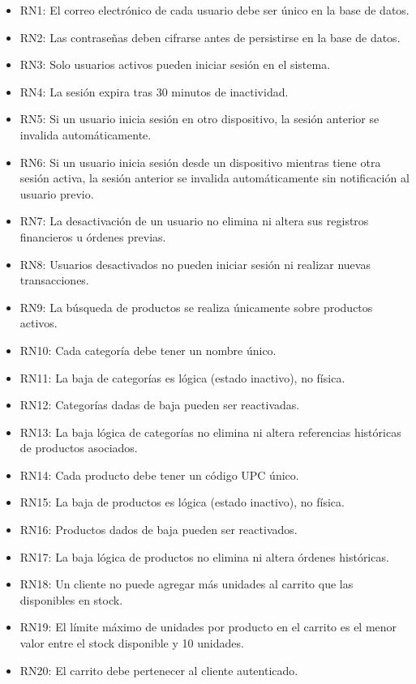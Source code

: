 \documentclass[12pt,a4paper]{article}
\begin{document}
\begin{itemize}[label=--]
    \item RN1: El correo electrónico de cada usuario debe ser único en la base de datos.
    \item RN2: Las contraseñas deben cifrarse antes de persistirse en la base de datos.
    \item RN3: Solo usuarios activos pueden iniciar sesión en el sistema.
    \item RN4: La sesión expira tras 30 minutos de inactividad.
    \item RN5: Si un usuario inicia sesión en otro dispositivo, la sesión anterior se invalida automáticamente.
    \item RN6: Si un usuario inicia sesión desde un dispositivo mientras tiene otra sesión activa, la sesión anterior se invalida automáticamente sin notificación al usuario previo.
    \item RN7: La desactivación de un usuario no elimina ni altera sus registros financieros u órdenes previas.
    \item RN8: Usuarios desactivados no pueden iniciar sesión ni realizar nuevas transacciones.
    \item RN9: La búsqueda de productos se realiza únicamente sobre productos activos.
    \item RN10: Cada categoría debe tener un nombre único.
    \item RN11: La baja de categorías es lógica (estado inactivo), no física.
    \item RN12: Categorías dadas de baja pueden ser reactivadas.
    \item RN13: La baja lógica de categorías no elimina ni altera referencias históricas de productos asociados.
    \item RN14: Cada producto debe tener un código UPC único.
    \item RN15: La baja de productos es lógica (estado inactivo), no física.
    \item RN16: Productos dados de baja pueden ser reactivados.
    \item RN17: La baja lógica de productos no elimina ni altera órdenes históricas.
    \item RN18: Un cliente no puede agregar más unidades al carrito que las disponibles en stock.
    \item RN19: El límite máximo de unidades por producto en el carrito es el menor valor entre el stock disponible y 10 unidades.
    \item RN20: El carrito debe pertenecer al cliente autenticado.

\end{itemize}
\end{document}
